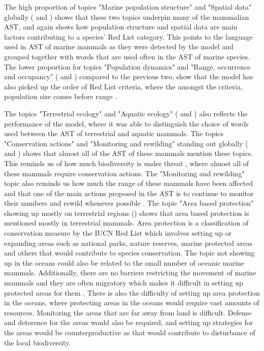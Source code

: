 The high proportion of topics "Marine population structure" and "Spatial data" globally ( and ) shows that these two topics underpin many of the mammalian AST, and again shows how population structure and spatial data are main factors contributing to a species' Red List category. This points to the language used in AST of marine mammals as they were detected by the model and grouped together with words that are used often in the AST of marine species. The lower proportion for topics "Population dynamics" and "Range, occurrence and occupancy" ( and ) compared to the previous two, show that the model has also picked up the order of Red List criteria, where the amongst the criteria, population size comes before range \parencite{iucn2012}.

The topics "Terrestrial ecology" and "Aquatic ecology" ( and ) also reflects the performance of the model, where it was able to distinguish the choice of words used between the AST of terrestrial and aquatic mammals. The topics "Conservation actions" and "Monitoring and rewilding" standing out globally ( and ) shows that almost all of the AST of these mammals mention these topics. This reminds us of how much biodiversity is under threat \parencite{butchart2010global}, where almost all of these mammals require conservation actions. The "Monitoring and rewilding" topic also reminds us how much the range of these mammals have been affected and that one of the main actions proposed in the AST is to continue to monitor their numbers and rewild whenever possible \parencite{thakur2020climate,perino2019rewilding,corlett2016restoration}. The topic "Area based protection" showing up mostly on terrestrial regions () shows that area based protection is mentioned mostly in terrestrial mammals. Area protection is a classification of conservation measure by the IUCN Red List \parencite{dudley2008guidelines} which involves setting up or expanding areas such as national parks, nature reserves, marine protected areas and others that would contribute to species conservation. The topic not showing up in the oceans could also be related to the small number of oceanic marine mammals. Additionally, there are no barriers restricting the movement of marine mammals and they are often migratory which makes it difficult in setting up protected areas for them \parencite{Lascelles2014MigratoryMS,Freeman2003DISTRIBUTIONOH}. There is also the difficulty of setting up area protection in the oceans, where protecting areas in the oceans would require vast amounts of resources. Monitoring the areas that are far away from land is difficult. Defense and deterence for the areas would also be required, and setting up strategies for the areas would be counterproductive as that would contribute to disturbance of the local biodiversity.

